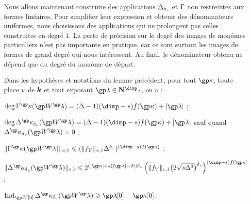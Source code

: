 Nous allons maintenant construire des applications \( \Delta_{\delta\smash{_v}} \) et \(
  \Gamma \) non restreintes aux formes linéaires. Pour simplifier leur
expression et obtenir des dénominateurs uniformes, nous choisissons des
applications qui ne prolongent pas celles construites en degré \( 1 \). La
perte de précision sur le degré des images de monômes particuliers n'est pas
importante en pratique, car ce sont surtout les images de formes de grand
degré qui nous intéressent. Au final, le dénominateur obtenu ne dépend que du
degré du monôme de départ.

\begin{lem}
  Dans les hypothèses et notations du lemme précédent, pour tout \( \derp \),
  toute place \( v \) de \( {\boldsymbol k} \) et tout exposant \( \ip \in \N^\dimp*
  \), on a :
  \begin{enumthm}
    \item \( \deg \pmden^\derp (\anyvp^\ip)
        = (\anydeg - 1) (\dimp - \anydim) f(\derp) + \lgr\ip \) ;
    \item \( \deg \pmnum^\derp_\dv (\anyvp^\ip)
        = (\anydeg - 1) (\dimp - \anydim) f(\derp) + \lgr\ip \) sauf quand
      \( \pmnum^\derp_\dv (\anyvp^\ip) = 0 \) ;
    \item \(
        \nv1{ \pmden^\derp     (\anyvp^\ip) }
        \le
        ( \nv1{ \chow\anyvar } \anydeg^\dv )^{(\dimp - \anydim) f(\derp)}
      \) ;
    \item \(
        \nv1{ \pmnum^\derp_\dv (\anyvp^\ip) }
        \le
        2^{ (\lgr\derp + \anydim (\lgr\ip - 2))\dv }
        \left(
          \nv1{ \chow\anyvar }
          \bigl( 2 \sqrt{\anydim \anydeg^{3}} \bigr)^\dv
        \right)^{(\dimp - \anydim) f(\derp)}
      \) ;
    \item \( \Aind_{\anyvp[0]} \pmnum^\derp_\dv (\anyvp^\ip)
        \ge \ip[0] - \derp[0] \).
  \end{enumthm}
\end{lem}

